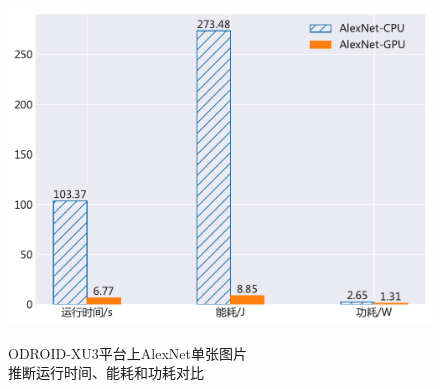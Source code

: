\begin{figure}[htbp]
\begin{minipage}[b]{.6\linewidth}
    \begin{center}
    \includegraphics[height=0.65\textwidth]{figures/alexnet_energy.pdf}
    \end{center}
    \caption{ODROID-XU3平台上AlexNet单张图片 \\ 推断运行时间、能耗和功耗对比}\label{figure:figure18}
\end{minipage}
\begin{minipage}[b]{.4\linewidth}
\centering
{}
\label{table:table8}
\end{minipage}
\end{figure}

%


